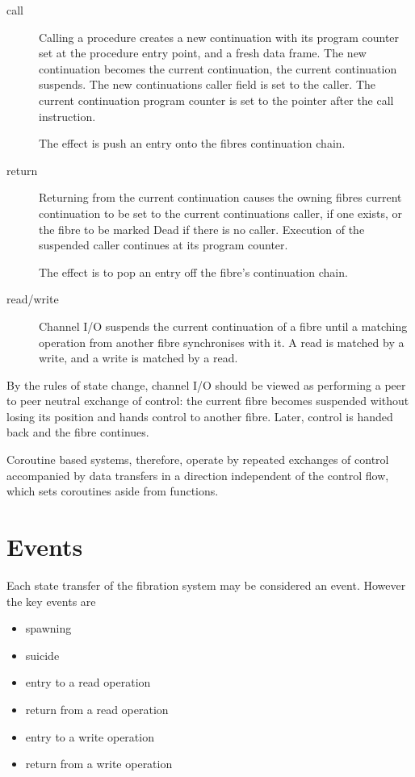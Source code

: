 \documentclass{article}
\begin{document}
\begin{description}
\item[call] Calling a procedure creates a new continuation
with its program counter set at the procedure entry point,
and a fresh data frame. The new continuation becomes the
current continuation, the current continuation suspends.
The new continuations caller field is set to the caller.
The current continuation program counter is set
to the pointer after the call instruction.

The effect is push an entry onto the fibres continuation chain.

\item[return] Returning from the current continuation causes
the owning fibres current continuation to be set to the
current continuations caller, if one exists, or the 
fibre to be marked Dead if there is no caller. Execution
of the suspended caller continues at its program counter.

The effect is to pop an entry off the fibre's continuation chain.

\item[read/write] Channel I/O suspends the current continuation
of a fibre until a matching operation from another fibre
synchronises with it. A read is matched by a write, and a write
is matched by a read.
\end{description}

By the rules of state change, channel I/O should be viewed
as performing a peer to peer neutral exchange of control:
the current fibre becomes suspended without losing its position
and hands control to another fibre. Later, control is handed
back and the fibre continues.

Coroutine based systems, therefore, operate by repeated exchanges
of control accompanied by data transfers in a direction independent
of the control flow, which sets coroutines aside from functions.

\section{Events}
Each state transfer of the fibration system may be considered
an event. However the key events are
\begin{itemize}
\item spawning
\item suicide
\item entry to a read operation
\item return from a read operation
\item entry to a write operation
\item return from a write operation
\end{itemize}
\end{document}
